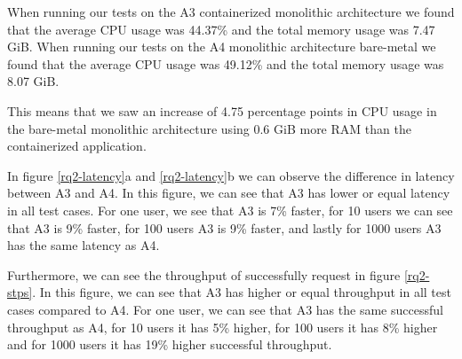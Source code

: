 \documentclass[a4paper,oneside]{bth}
\begin{document}
\par\vspace{0.5cm}
When running our tests on the A3 containerized monolithic architecture we found that the average CPU usage was 44.37\% and the total memory usage was 7.47 GiB. When running our tests on the A4 monolithic architecture bare-metal we found that the average CPU usage was 49.12\% and the total memory usage was 8.07 GiB.

\par\vspace{0.5cm}
This means that we saw an increase of 4.75 percentage points in CPU usage in the bare-metal monolithic architecture using 0.6 GiB more RAM than the containerized application.

\par\vspace{0.5cm}
In figure \ref{rq2-latency}a and \ref{rq2-latency}b we can observe the difference in latency between A3 and A4. In this figure, we can see that A3 has lower or equal latency in all test cases.
For one user, we see that A3 is 7\% faster, for 10 users we can see that A3 is 9\% faster, for 100 users A3 is 9\% faster, and lastly for 1000 users A3 has the same latency as A4. 

\par\vspace{0.5cm}
Furthermore, we can see the throughput of successfully request in figure \ref{rq2-stps}. In this figure, we can see that A3 has higher or equal throughput in all test cases compared to A4. For one user, we can see that A3 has the same successful throughput as A4, for 10 users it has 5\% higher, for 100 users it has 8\% higher and for 1000 users it has 19\% higher successful throughput. 
\end{document}
